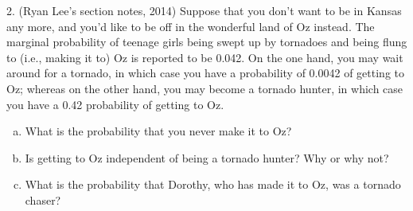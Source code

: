 \documentclass{article}
\begin{document}
2. (Ryan Lee's section notes, 2014) Suppose that you don't want to be in Kansas any more, and you'd like to be off in the wonderful land of Oz instead. The marginal probability of teenage girls being swept up by tornadoes and being flung to (i.e., making it to) Oz is reported to be 0.042. On the one hand, you may wait around for a tornado, in which case you have a probability of 0.0042 of getting to Oz; whereas on the other hand, you may become a tornado hunter, in which case you have a 0.42 probability of getting to Oz.

\begin{enumerate}[(a)]
    \item What is the probability that you never make it to Oz?
    
    
    \item Is getting to Oz independent of being a tornado hunter? Why or why not?
    
    
    \item What is the probability that Dorothy, who has made it to Oz, was a tornado chaser?
    
\end{enumerate}


\end{document}
